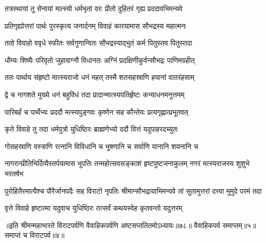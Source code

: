 \twolineshloka
{तत्रस्थायां तु सेनायां मात्स्यो धर्मभृतां वरः}
{प्रीतो दुहितरं गृह्य प्रददावभिमन्यवे}


\twolineshloka
{प्रतिगृह्योत्तरां पार्थः पुरस्कृत्य जनार्दनम्}
{विवाहं कारयामास सौभद्रस्य महात्मनः}


\twolineshloka
{ततो विवाहो ववृधे स्फीतः सर्वगुणान्वितः}
{सौभद्रस्याद्भुतं कर्म पितुस्तव पितुस्तदा}


\twolineshloka
{धौम्यः शिष्यैः परिवृतो जुहावाग्नौ विधानतः}
{अग्निं प्रदक्षिणीकुर्वन्सौभद्रः पाणिमग्रहीत्}


\twolineshloka
{ततः पार्थाय संहृष्टो मात्स्यराजो धनं महत्}
{तस्मै शतसहस्राणि हयानां वातरंहसाम्}


\twolineshloka
{द्वे च नागशते मुख्ये धनं बहुविधं तदा}
{प्रादान्मात्स्यपतिर्हृष्टः कन्याधनमनुत्तमम्}


\twolineshloka
{पारिबर्हं च पार्थेभ्यः प्रददौ मत्स्यपुङ्गवः}
{कृष्णेन सह कौन्तेयः प्रत्यगृह्णात्प्रभूतवत्}


\twolineshloka
{कृते विवाहे तु तदा धर्मपुत्रो युधिष्ठिरः}
{ब्राह्मणेभ्यो ददौ वित्तं यदुपाहरदच्युतः}


\twolineshloka
{गोसहस्राणि वस्त्राणि रत्नानि विविधानि च}
{भूषणानि च सर्वाणि यानानि शयनानि च}


\onelineshloka
{नागरान्प्रीतिभिर्दिव्यैस्तर्पयामास भूपतिः}
\twolineshloka
{तन्महोत्सवसङ्काशं हृष्टपुष्टजनाकुलम्}
{नगरं मत्स्यराजस्य शुशुभे भरतर्षभ}


\threelineshloka
{पुरोहितैरमात्यैश्च पौरैर्जानपदैः सह}
{विराटो नृपतिः श्रीमान्सौभद्रायाभिमन्यवे}
{तां सुतामुत्तरां दत्त्वा मुमुदे परमं तदा}




\twolineshloka
{वृत्ते विवाहे हृष्टात्मा यदुवाच युधिष्ठिरः}
{तत्सर्वं कथयस्वेह कृतवन्तो यदुत्तरम्}

॥इति श्रीमन्महाभारते विराटपर्वणि वैवाहिकपर्वणि अष्टसप्ततितमोऽध्यायः॥७८॥ वैवाहिकपर्व समाप्तम्॥५॥ समाप्तं च विराटपर्व॥४॥
